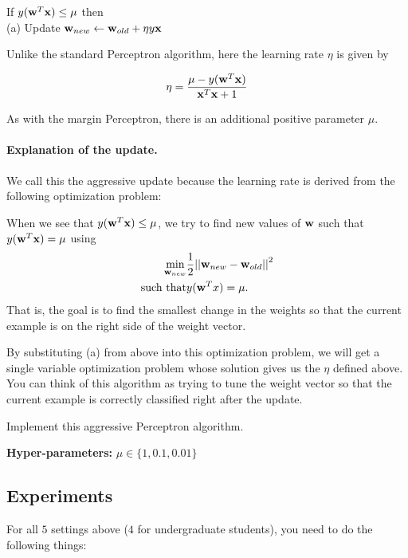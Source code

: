 \begin{enumerate}
  If $y({\bf w}^T {\bf x}) \leq \mu$ then  \\
  \null\quad\quad (a) Update ${\bf w}_{new} \leftarrow {\bf w}_{old} + \eta y{\bf x}$


  Unlike the standard Perceptron algorithm, here the learning
  rate $\eta$ is given by

  \begin{align*}
    \eta = \frac{\mu - y({\bf w}^T {\bf x}) }{{\bf x}^T {\bf x} +1}
  \end{align*}

  As with the margin Perceptron, there is an additional positive parameter $\mu$.

  \paragraph{Explanation of the update.} We call this the aggressive update because the learning rate is derived from the following optimization problem:

  When we see that $y({\bf w}^T {\bf x}) \leq \mu$, we try to find new values of ${\bf w}$ such that $y({\bf w}^T {\bf x}) = \mu$ using
  \begin{eqnarray*}
    \min_{{\bf w}_{new}} &     \frac{1}{2} {||\textbf{${\bf w}_{new}$} - \textbf{${\bf w}_{old}$}||}^2\\
    \mbox{such that} & y({\bf w}^T x) = \mu.
  \end{eqnarray*}
  That is, the goal is to find the smallest change in the weights so that the current example is on the right side of the weight vector.

  By substituting (a) from above into this optimization problem, we will get a single variable optimization problem whose solution gives us the $\eta$ defined above. You can think of this algorithm as trying to tune the weight vector so that the current example is correctly classified right after the update.

  Implement this aggressive Perceptron algorithm.

  \textbf{Hyper-parameters:} $\mu\in\{1,0.1,0.01\}$

\end{enumerate}


\subsection{Experiments}

For all $5$ settings above ($4$ for undergraduate students), you need to do the following things:


